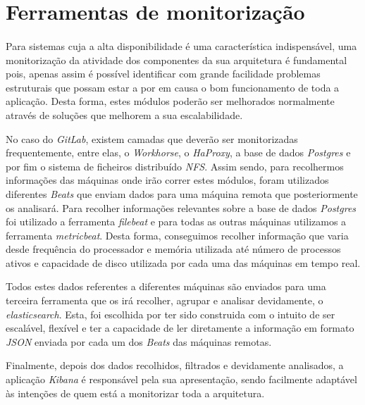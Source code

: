 \documentclass[12pt,a4paper]{article}
\begin{document}
\newpage
\section{Ferramentas de monitorização}
\paragraph{} Para sistemas cuja a alta disponibilidade é uma característica indispensável, uma monitorização da atividade dos componentes da sua arquitetura é fundamental pois, apenas assim é possível identificar com grande facilidade problemas estruturais que possam estar a por em causa o bom funcionamento de toda a aplicação. Desta forma, estes módulos poderão ser melhorados normalmente através de soluções que melhorem a sua escalabilidade.
\par No caso do \emph{GitLab}, existem camadas que deverão ser monitorizadas frequentemente, entre elas, o \emph{Workhorse}, o \emph{HaProxy}, a base de dados \emph{Postgres} e por fim o sistema de ficheiros distribuído \emph{NFS}. Assim sendo, para recolhermos informações das máquinas onde irão correr estes módulos, foram utilizados diferentes \emph{Beats} que enviam dados para uma máquina remota que posteriormente os analisará. Para recolher informações relevantes sobre a base de dados \emph{Postgres} foi utilizado a ferramenta \emph{filebeat} e para todas as outras máquinas utilizamos a ferramenta \emph{metricbeat}. Desta forma, conseguimos recolher informação que varia desde frequência do processador e memória utilizada até número de processos ativos e capacidade de disco utilizada por cada uma das máquinas em tempo real.
\par Todos estes dados referentes a diferentes máquinas são enviados para uma terceira ferramenta que os irá recolher, agrupar e analisar devidamente, o \emph{elasticsearch}. Esta, foi escolhida por ter sido construida com o intuito de ser escalável, flexível e ter a capacidade de ler diretamente a informação em formato \emph{JSON} enviada por cada um dos \emph{Beats} das máquinas remotas.
\par Finalmente, depois dos dados recolhidos, filtrados e devidamente analisados, a aplicação \emph{Kibana} é responsável pela sua apresentação, sendo facilmente adaptável às intenções de quem está a monitorizar toda a arquitetura.
\end{document}
